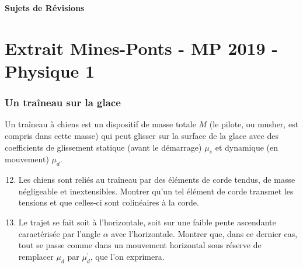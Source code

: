 










\begin{tcolorbox}[colback=white,colframe=black!75!black]
\par
\begin{center}
    \LARGE{\textbf{Sujets de Révisions}}
\vspace{0.5em}
\end{center}
\end{tcolorbox}

\section*{Extrait Mines-Ponts - MP 2019 - Physique 1}


\subsubsection*{Un traîneau sur la glace}



Un traîneau à chiens est un dispositif de masse totale $M$ (le pilote, ou musher, est compris dans cette masse) qui peut glisser sur la surface de la glace avec des coefficients de glissement statique (avant le démarrage) $\mu_s$ et dynamique (en mouvement) $\mu_d$.
\begin{enumerate}
  \setcounter{enumi}{11}
\item \dur Les chiens sont reliés au traîneau par des éléments de corde tendus, de masse négligeable et inextensibles. Montrer qu'un tel élément de corde transmet les tensions et que celles-ci sont colinéaires à la corde.
\item \moyen  Le trajet se fait soit à l'horizontale, soit sur une faible pente ascendante caractérisée par l'angle $\alpha$ avec l'horizontale. Montrer que, dans ce dernier cas, tout se passe comme dans un mouvement horizontal sous réserve de remplacer $\mu_d$ par $\mu_d^{\prime}$, que l'on exprimera.
\end{enumerate}





